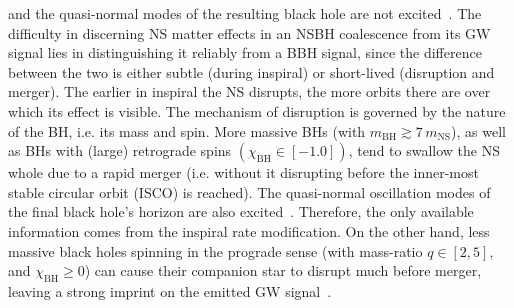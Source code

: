 \documentclass[aps,prd,amsmath,floats,floatfix, twocolumn,
superscriptaddress,nofootinbib,showpacs]{revtex4-1}
\begin{document}
and the quasi-normal modes of the resulting black hole are not 
excited~\cite{Kyutoku:2010zd,Lackey:2013axa,Lovelace:2013vma,Foucart2015,
Pannarale:2015jia}.
% 
% 
The difficulty in discerning NS matter effects in an NSBH coalescence from its
GW signal lies in distinguishing it reliably from a BBH signal, since the 
difference between the two is either subtle (during inspiral) or short-lived
(disruption and merger). The earlier in inspiral the NS disrupts, the more
orbits there are over which its effect is visible. The mechanism of disruption
is governed by the nature of the BH, i.e. its mass and spin. More massive BHs 
(with $m_\mathrm{BH}\gtrsim 7\, m_\mathrm{NS}$), as well as BHs with
(large) retrograde spins $(\chi_\mathrm{BH}\in[-1. 0])$, tend to swallow the 
NS whole due to a rapid merger (i.e. without it disrupting before the
inner-most stable circular orbit (ISCO) is reached). The quasi-normal
oscillation modes of the final black hole's horizon are also 
excited~\cite{Foucart:2013psa}. Therefore, the only available information 
comes from the inspiral rate modification. On the other hand, less massive
black holes spinning in the prograde sense (with mass-ratio 
$q\in[2, 5]$, and $\chi_\mathrm{BH}\geq 0$) can cause their companion star to 
disrupt much before merger, leaving a strong imprint on the emitted GW 
signal~\cite{Shibata:2007zm,2010PhRvD..81f4026F,Lovelace:2013vma,
Kawaguchi:2015}.
\end{document}
